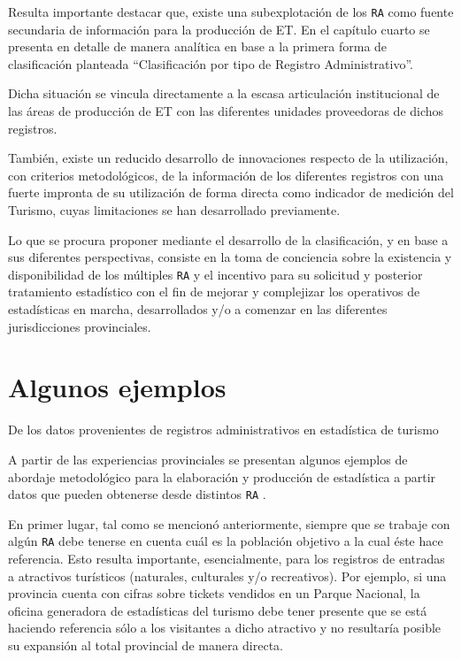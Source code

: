 \documentclass[
]{book}
\begin{document}
Resulta importante destacar que, existe una subexplotación de los \texttt{RA} como fuente secundaria de información para la producción de ET. En el capítulo cuarto se presenta en detalle de manera analítica en base a la primera forma de clasificación planteada ``Clasificación por tipo de Registro Administrativo''.

Dicha situación se vincula directamente a la escasa articulación institucional de las áreas de producción de ET con las diferentes unidades proveedoras de dichos registros.

También, existe un reducido desarrollo de innovaciones respecto de la utilización, con criterios metodológicos, de la información de los diferentes registros con una fuerte impronta de su utilización de forma directa como indicador de medición del Turismo, cuyas limitaciones se han desarrollado previamente.

Lo que se procura proponer mediante el desarrollo de la clasificación, y en base a sus diferentes perspectivas, consiste en la toma de conciencia sobre la existencia y disponibilidad de los múltiples \texttt{RA} y el incentivo para su solicitud y posterior tratamiento estadístico con el fin de mejorar y complejizar los operativos de estadísticas en marcha, desarrollados y/o a comenzar en las diferentes jurisdicciones provinciales.

\hypertarget{algunos-ejemplos}{%
\chapter{\texorpdfstring{\textbf{Algunos ejemplos}}{Algunos ejemplos}}\label{algunos-ejemplos}}

De los datos provenientes de registros administrativos en estadística de turismo

A partir de las experiencias provinciales se presentan algunos ejemplos de abordaje metodológico para la elaboración y producción de estadística a partir datos que pueden obtenerse desde distintos \texttt{RA} .

En primer lugar, tal como se mencionó anteriormente, siempre que se trabaje con algún \texttt{RA} debe tenerse en cuenta cuál es la población objetivo a la cual éste hace referencia. Esto resulta importante, esencialmente, para los registros de entradas a atractivos turísticos (naturales, culturales y/o recreativos). Por ejemplo, si una provincia cuenta con cifras sobre tickets vendidos en un Parque Nacional, la oficina generadora de estadísticas del turismo debe tener presente que se está haciendo referencia sólo a los visitantes a dicho atractivo y no resultaría posible su expansión al total provincial de manera directa.
\end{document}
